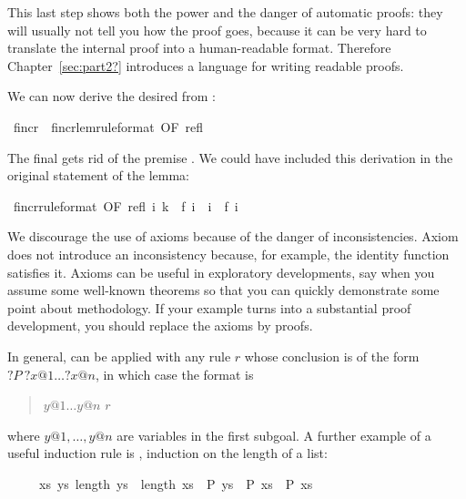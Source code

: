 \begin{isabellebody}
\begin{isamarkuptext}
This last step shows both the power and the danger of automatic proofs: they
will usually not tell you how the proof goes, because it can be very hard to
translate the internal proof into a human-readable format. Therefore
Chapter~\ref{sec:part2?} introduces a language for writing readable
proofs.

We can now derive the desired  from :%
\end{isamarkuptext}%
\ f{\isacharunderscore}incr\ {\isacharequal}\ f{\isacharunderscore}incr{\isacharunderscore}lem{\isacharbrackleft}rule{\isacharunderscore}format{\isacharcomma}\ OF\ refl{\isacharbrackright}%
\begin{isamarkuptext}%
\noindent
The final  gets rid of the premise . 
We could have included this derivation in the original statement of the lemma:%
\end{isamarkuptext}%
\ f{\isacharunderscore}incr{\isacharbrackleft}rule{\isacharunderscore}format{\isacharcomma}\ OF\ refl{\isacharbrackright}{\isacharcolon}\ {\isachardoublequote}{\isasymforall}i{\isachardot}\ k\ {\isacharequal}\ f\ i\ {\isasymlongrightarrow}\ i\ {\isasymle}\ f\ i{\isachardoublequote}%
\begin{isamarkuptext}%
\begin{warn}
We discourage the use of axioms because of the danger of
inconsistencies.  Axiom  does
not introduce an inconsistency because, for example, the identity function
satisfies it.  Axioms can be useful in exploratory developments, say when 
you assume some well-known theorems so that you can quickly demonstrate some
point about methodology.  If your example turns into a substantial proof
development, you should replace the axioms by proofs.
\end{warn}

\bigskip
In general,  can be applied with any rule $r$
whose conclusion is of the form ${?}P~?x@1 \dots ?x@n$, in which case the
format is
\begin{quote}
 $y@1 \dots y@n$  $r$\isa{{\isacharparenright}}
\end{quote}%
where $y@1, \dots, y@n$ are variables in the first subgoal.
A further example of a useful induction rule is ,
induction on the length of a list:
\begin{isabelle}%
\ \ \ \ \ {\isacharparenleft}{\isasymAnd}xs{\isachardot}\ {\isasymforall}ys{\isachardot}\ length\ ys\ {\isacharless}\ length\ xs\ {\isasymlongrightarrow}\ P\ ys\ {\isasymLongrightarrow}\ P\ xs{\isacharparenright}\ {\isasymLongrightarrow}\ P\ xs%
\end{isabelle}


\end{isamarkuptext}
\end{isabellebody}
